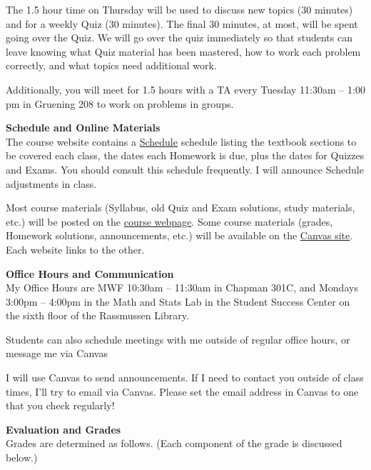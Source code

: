 \documentclass[12pt]{article}
\renewcommand{\emph}[1]{\textsf{\textbf{#1}}}
\newcommand{\localhead}[1]{\par\smallskip\textbf{#1} \smallskip\nobreak\\}%
\def\heading#1{\localhead{\large\emph{#1}}}
\begin{document}
The 1.5 hour time on Thursday will be used to discuss new topics (30 minutes) and for a weekly Quiz (30 minutes).  The final 30 minutes, at most, will be spent going over the Quiz.  We will go over the quiz immediately so that students can leave knowing what Quiz material has been mastered, how to work each problem correctly, and what topics need additional work.

Additionally, you will meet for 1.5 hours with a TA every Tuesday
11:30am -- 1:00 pm in Gruening 208 to work on problems in groups.

\clearpage\newpage

\strut

\vspace{-12pt}

\heading{Schedule and Online Materials}
The course website contains a
\href{https://uaf-math251.github.io/calc2/assets/general/S24/Bueler/schedule.pdf}{Schedule}
schedule
listing the textbook sections to be covered each class, the dates each
Homework is due, plus the dates for Quizzes and Exams. You should
consult this schedule frequently.  I will announce Schedule
adjustments in class.

Most course materials (Syllabus, old Quiz and Exam solutions, study materials, etc.) will be posted on the \href{https://uaf-math251.github.io/calc2/}{course webpage}.  Some course materials (grades, Homework solutions, announcements, etc.) will be available on the \href{https://canvas.alaska.edu/courses/21592}{Canvas site}.  Each website links to the other.


\heading{Office Hours and Communication}
My Office Hours are MWF 10:30am -- 11:30am in Chapman 301C, and
Mondays 3:00pm -- 4:00pm in the Math and Stats Lab in the Student
Success Center on the sixth floor of the Rassmussen Library.

Students can also schedule meetings with me outside of regular office
hours, or message me via Canvas


I will use Canvas to send announcements.  If I need to contact you outside of class times, I'll try to email via Canvas.  Please set the email address in Canvas to one that you check regularly!


\heading{Evaluation and Grades}
Grades are determined as follows.  (Each component of the grade is discussed below.)
 
\end{document}
